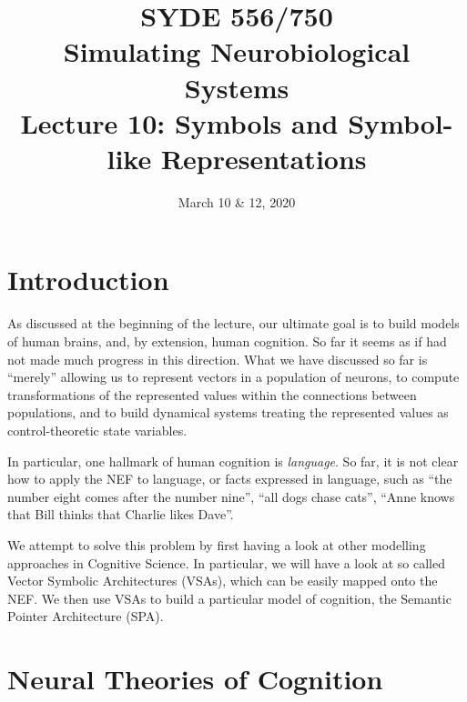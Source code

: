 \documentclass[10pt,letterpaper,oneside]{article}
\date{March 10 \& 12, 2020}
\title{SYDE 556/750 \\ Simulating Neurobiological Systems \\ Lecture 10: Symbols and Symbol-like Representations}
\begin{document}

\section{Introduction}


As discussed at the beginning of the lecture, our ultimate goal is to build models of human brains, and, by extension, human cognition. So far it seems as if had not made much progress in this direction. What we have discussed so far is \enquote{merely} allowing us to represent vectors in a population of neurons, to compute transformations of the represented values within the connections between populations, and to build dynamical systems treating the represented values as control-theoretic state variables.

In particular, one hallmark of human cognition is \emph{language}. So far, it is not clear how to apply the NEF to language, or facts expressed in language, such as \enquote{the number eight comes after the number nine}, \enquote{all dogs chase cats}, \enquote{Anne knows that Bill thinks that Charlie likes Dave}.

We attempt to solve this problem by first having a look at other modelling approaches in Cognitive Science. In particular, we will have a look at so called Vector Symbolic Architectures (VSAs), which can be easily mapped onto the NEF. We then use VSAs to build a particular model of cognition, the Semantic Pointer Architecture (SPA).

\section{Neural Theories of Cognition}

\end{document}
